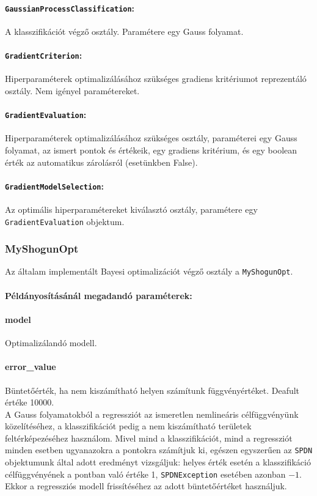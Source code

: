 \paragraph{\texttt{GaussianProcessClassification}:}
A klasszifikációt végző osztály. Paramétere egy Gauss folyamat.
\paragraph{\texttt{GradientCriterion}:}
Hiperparaméterek optimalizálásához szükséges gradiens kritériumot reprezentáló osztály. Nem igényel paramétereket.
\paragraph{\texttt{GradientEvaluation}:}
Hiperparaméterek optimalizálásához szükséges osztály, paraméterei egy Gauss folyamat, az ismert pontok és értékeik, egy gradiens kritérium, és egy boolean érték az automatikus zárolásról (esetünkben False).
\paragraph{\texttt{GradientModelSelection}:}
Az optimális hiperparamétereket kiválasztó osztály, paramétere egy \texttt{GradientEvaluation} objektum.

\subsubsection{MyShogunOpt}

Az általam implementált Bayesi optimalizációt végző osztály a \texttt{MyShogunOpt}.
\paragraph{Példányosításánál megadandó paraméterek:}
\paragraph{model} Optimalizálandó modell.
\paragraph{error\_value} Büntetőérték, ha nem kiszámítható helyen számítunk függvényértéket. Deafult értéke 10000.\\

A Gauss folyamatokból a regressziót az ismeretlen nemlineáris célfüggvényünk közelítéséhez, a klasszifikációt pedig a nem kiszámítható területek feltérképezéséhez használom. Mivel mind a klasszifikációt, mind a regressziót minden esetben ugyanazokra a pontokra számítjuk ki, egészen egyszerűen az \texttt{SPDN} objektumunk által adott eredményt vizsgáljuk: helyes érték esetén a klasszifikáció célfüggvényének a pontban való értéke 1, \texttt{SPDNException} esetében azonban $-1$. Ekkor a regressziós modell frissítéséhez az adott büntetőértéket használjuk.


